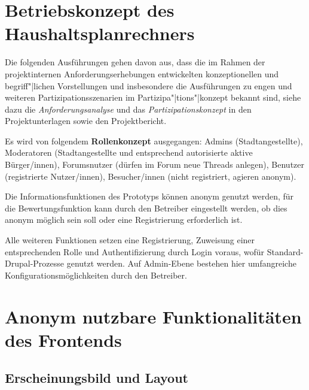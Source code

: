 \documentclass[11pt,a4paper,twoside]{article}
\begin{document}
\section{Betriebskonzept des Haushaltsplanrechners}

Die folgenden Ausführungen gehen davon aus, dass die im Rahmen der
projektinternen Anforderungserhebungen entwickelten konzeptionellen und
begriff"|lichen Vorstellungen und insbesondere die Ausführungen zu engen und
weiteren Partizipationsszenarien im Partizipa"|tions"|konzept bekannt sind,
siehe dazu die \emph{Anforderungsanalyse} und das \emph{Partizipationskonzept}
in den Projektunterlagen sowie den Projektbericht.

Es wird von folgendem \textbf{Rollenkonzept} ausgegangen: Admins
(Stadtangestellte), Moderatoren (Stadtangestellte und entsprechend autorisierte
aktive Bürger/innen), Forumsnutzer (dürfen im Forum neue Threads anlegen),
Benutzer (registrierte Nutzer/innen), Besucher/innen (nicht registriert,
agieren anonym).

Die Informationsfunktionen des Prototyps können anonym genutzt werden, für die
Bewertungsfunktion kann durch den Betreiber eingestellt werden, ob dies anonym
möglich sein soll oder eine Registrierung erforderlich ist.  

Alle weiteren Funktionen setzen eine Registrierung, Zuweisung einer
entsprechenden Rolle und Authentifizierung durch Login voraus, wofür
Standard-Drupal-Prozesse genutzt werden. Auf Admin-Ebene bestehen hier
umfangreiche Konfigurationsmöglichkeiten durch den Betreiber.

\section{Anonym nutzbare Funktionalitäten des Frontends}

\subsection{Erscheinungsbild und Layout}
\end{document}
